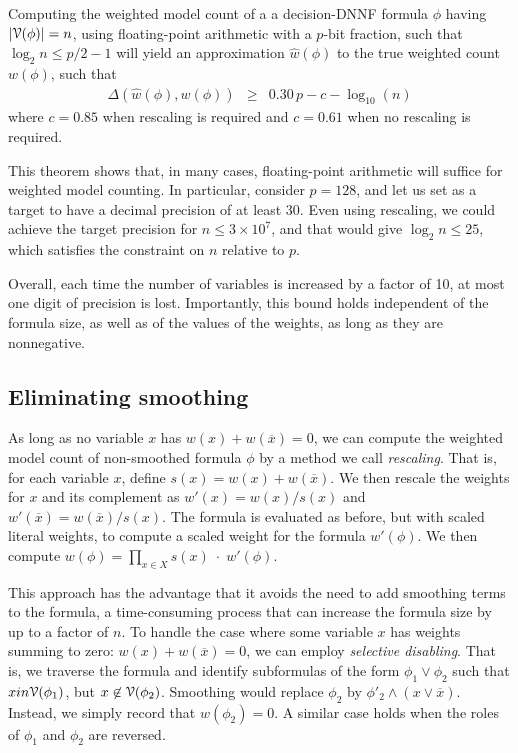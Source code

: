 \documentclass[letterpaper,USenglish,cleveref, autoref, thm-restate]{lipics-v2021}
\newcommand{\obar}[1]{\overline{#1}}
\newcommand{\approximate}[1]{\hat{#1}}
\newcommand{\approxw}{\approximate{w}}
\newcommand{\digitprecision}{\Delta}
\newcommand{\varset}{X}
\newcommand{\dependencyset}{{\cal V}}
\begin{document}
\begin{theorem}
  \label{thm:approx:pos}
Computing the weighted model count of a
a decision-DNNF formula $\phi$ having $|\dependencyset(\phi)| = n$, using floating-point arithmetic with a $p$-bit fraction, such that $\log_2 n \leq p/2-1$
will yield an approximation $\approxw(\phi)$ to the true weighted count $w(\phi)$, such that
\begin{eqnarray}
\digitprecision(\approxw(\phi), w(\phi)) & \geq & 0.30\,p - c - \log_{10}(n) \label{eqn:precision:wmc}
\end{eqnarray}
where $c = 0.85$ when rescaling is required and $c = 0.61$ when no rescaling is required.
\end{theorem}

This theorem shows that, in many cases, floating-point arithmetic will suffice for weighted model counting.  In particular, consider $p=128$, and let us set as a target to have a decimal precision of at least $30$.
Even using rescaling, we could achieve the target precision for $n \leq 3 \times 10^7$, and that would give $\log_2 n \leq 25$, which satisfies the constraint on $n$ relative to $p$.

Overall, each time
the number of variables is increased by a factor of 10, at most one
digit of precision is lost.
Importantly, this bound holds independent of the formula size, as well as of the values of the weights, as long as they are nonnegative.


\subsection{Eliminating smoothing}

As long as no variable $x$ has $w(x) + w(\obar{x}) = 0$, we can 
compute the weighted model count of non-smoothed formula $\phi$ by a method we call
\emph{rescaling}.  That is, for each variable $x$, define $s(x) = w(x)
+ w(\obar{x})$.  We then rescale the weights for $x$ and its
complement as $w'(x) = w(x)/s(x)$ and $w'(\obar{x}) = w(\obar{x})/s(x)$.  The formula is evaluated as before, but with
scaled literal weights, to compute a scaled weight for the formula $w'(\phi)$.  We then
compute $w(\phi) = \prod_{x\in\varset} s(x) \; \cdot \; w'(\phi)$.

This approach has the advantage that it avoids the need to add
smoothing terms to the formula, a time-consuming process that can
increase the formula size by up to a factor of $n$.  To handle the
case where some variable $x$ has weights summing to zero:
$w(x) + w(\obar{x}) = 0$, we can employ \emph{selective disabling}.  That is,
we traverse the formula and identify subformulas of the form
$\phi_1 \lor \phi_2$ such that
$x in \dependencyset(\phi_1)$, but $x \not \in \dependencyset(\phi_2)$.
Smoothing would replace $\phi_2$ by $\phi'_2 \land (x \lor \obar{x})$.
Instead, we simply record that $w(\phi_2) = 0$.  A similar case holds when the roles of $\phi_1$ and $\phi_2$ are reversed.
\end{document}
